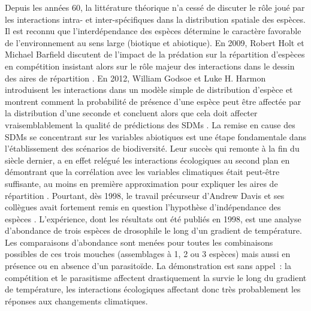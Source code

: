 Depuis les années 60, la littérature théorique n'a cessé de discuter le
rôle joué par les interactions intra- et inter-spécifiques dans la
distribution spatiale des espèces. Il est reconnu que l'interdépendance
des espèces détermine le caractère favorable de l'environnement au sens
large (biotique et abiotique). En 2009, Robert Holt et Michael Barfield
discutent de l'impact de la prédation sur la répartition d'espèces en
compétition insistant alors sur le rôle majeur des interactions dans le
dessin des aires de répartition \citep{Holt2009}. En 2012, William
Godsoe et Luke H. Harmon introduisent les interactions dans un modèle
simple de distribution d'espèce et montrent comment la probabilité de
présence d'une espèce peut être affectée par la distribution d'une
seconde et concluent alors que cela doit affecter vraisemblablement la
qualité de prédictions des SDMs \citep{Godsoe2012}. La remise en cause
des SDMs se concentrant sur les variables abiotiques est une étape
fondamentale dans l'établissement des scénarios de biodiversité. Leur
succès qui remonte à la fin du siècle dernier, a en effet relégué les
interactions écologiques au second plan en démontrant que la corrélation
avec les variables climatiques était peut-être suffisante, au moins en
première approximation pour expliquer les aires de répartition
\citep{Pearson2003}. Pourtant, dès 1998, le travail précurseur d'Andrew
Davis et ses collègues \citep{Davis1998} avait fortement remis en
question l'hypothèse d'indépendance des espèces \citep{Jeschke2008}.
L'expérience, dont les résultats ont été publiés en 1998, est une
analyse d'abondance de trois espèces de drosophile le long d'un gradient
de température. Les comparaisons d'abondance sont menées pour toutes les
combinaisons possibles de ces trois mouches (assemblages à 1, 2 ou 3
espèces) mais aussi en présence ou en absence d'un parasitoïde. La
démonstration est sans appel~: la compétition et le parasitisme
affectent drastiquement la survie le long du gradient de température,
les interactions écologiques affectant donc très probablement les
réponses aux changements climatiques.

